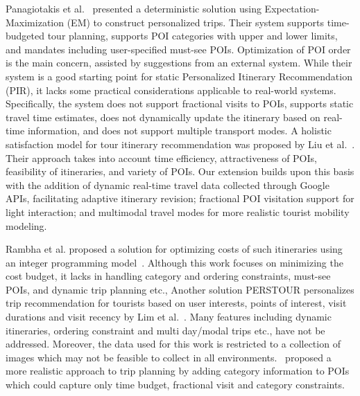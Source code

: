 Panagiotakis et al.~\cite{panagiotakis2024expectation}  presented a deterministic solution using Expectation-Maximization (EM) to construct personalized trips. Their system supports time-budgeted tour planning, supports POI categories with upper and lower limits, and mandates including user-specified must-see POIs. Optimization of POI order is the main concern, assisted by suggestions from an external system. While their system is a good starting point for static Personalized Itinerary Recommendation (PIR), it lacks some practical considerations applicable to real-world systems. Specifically, the system does not support fractional visits to POIs, supports static travel time estimates, does not dynamically update the itinerary based on real-time information, and does not support multiple transport modes. A holistic satisfaction model for tour itinerary recommendation was proposed by Liu et al.~\cite{liu2024personalized}. Their approach takes into account time efficiency, attractiveness of POIs, feasibility of itineraries, and variety of POIs. Our extension builds upon this basis with the addition of dynamic real-time travel data collected through Google APIs, facilitating adaptive itinerary revision; fractional POI visitation support for light interaction; and multimodal travel modes for more realistic tourist mobility modeling. 

Rambha et al.  proposed a solution for optimizing costs of such itineraries using an integer programming model~\cite{rambha2024optimized}. Although this work focuses on minimizing the cost budget, it lacks in handling category and ordering constraints, must-see POIs, and dynamic trip planning etc., Another solution PERSTOUR personalizes trip recommendation for tourists based on user interests, points of interest, visit durations and visit recency by Lim et al.~\cite{lim2018personalized}. Many features including dynamic itineraries, ordering constraint and multi day/modal trips etc., have not be addressed. Moreover, the data used for this work is restricted to a collection of images which may not be feasible to collect in all environments.~\cite{bolzoni2014efficient} proposed a more realistic approach to trip planning by adding category information to POIs which could capture only time budget, fractional visit and category constraints. 

